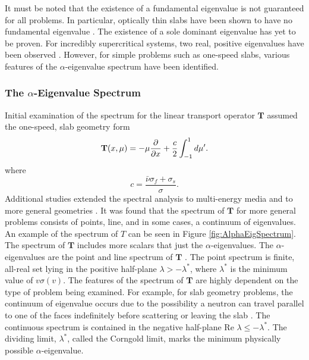 It must be noted that the existence of a fundamental eigenvalue is not guaranteed for all problems. In particular, optically thin slabs have been shown to have no fundamental eigenvalue \cite{kornreich_timeeigenvalue_2005}. The existence of a sole dominant eigenvalue has yet to be proven. For incredibly supercritical systems, two real, positive eigenvalues have been observed \cite{kornreich_timeeigenvalue_2005}. However, for simple problems such as one-speed slabs, various features of the $\alpha$-eigenvalue spectrum have been identified.

\subsubsection{The $\alpha$-Eigenvalue Spectrum}

Initial examination of the spectrum \cite{lehner_spectrum_1955} for the linear transport operator $\mathbf{T}$ assumed the one-speed, slab geometry form
\begin{equation}
	\mathbf{T}(x,\mu) = -\mu \frac{\partial}{\partial x} + \frac{c}{2} \int_{-1}^{1} \mathop{}\!d \mu'.
\end{equation}
where
\begin{equation}
	c = \frac{\bar{\nu} \sigma_{f} + \sigma_{s}}{\sigma}.
\end{equation}
Additional studies extended the spectral analysis to multi-energy media \cite{jorgens_asymptotic_1958} and to more general geometries \cite{larsen_spectrum_1974}. It was found that the spectrum of $\mathbf{T}$ for more general problems consists of points, line, and in some cases, a continuum of eigenvalues. An example of the spectrum of $T$ can be seen in Figure \ref{fig:AlphaEigSpectrum}. The spectrum of $\mathbf{T}$ includes more scalars that just the $\alpha$-eigenvalues. The $\alpha$-eigenvalues are the point and line spectrum of $\mathbf{T}$ \cite{duderstadt_transport_1979}. The point spectrum is finite, all-real set lying in the positive half-plane $\lambda > -\lambda^{*}$, where $\lambda^{*}$ is the minimum value of $v\sigma(v)$. The features of the spectrum of $\mathbf{T}$ are highly dependent on the type of problem being examined. For example, for slab geometry problems, the continuum of eigenvalue occurs due to the possibility a neutron can travel parallel to one of the faces indefinitely before scattering or leaving the slab \cite{wing_transport_1962}. The continuous spectrum is contained in the negative half-plane Re $\lambda \le -\lambda^{*}$. The dividing limit, $\lambda^{*}$, called the Corngold limit, marks the minimum physically possible $\alpha$-eigenvalue.

